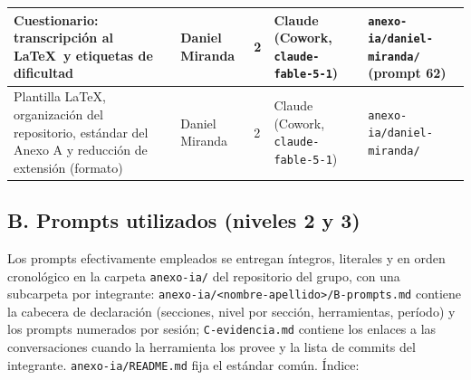 \documentclass[12pt, letterpaper, table, xcdraw]{inf-pucv}
\begin{document}
{\begin{longtable}{|p{4.2cm}|p{2.2cm}|p{0.9cm}|p{4.2cm}|p{2.4cm}|}
    Cuestionario: transcripción al \LaTeX\ y etiquetas de dificultad & Daniel Miranda & 2 & Claude (Cowork, \texttt{claude-fable-5-1}) & \texttt{anexo-ia/daniel-miranda/} (prompt 62) \\ \hline
    Plantilla \LaTeX, organización del repositorio, estándar del Anexo A y reducción de extensión (formato) & Daniel Miranda & 2 & Claude (Cowork, \texttt{claude-fable-5-1}) & \texttt{anexo-ia/daniel-miranda/} \\ \hline
\end{longtable}
}

\subsection*{B. Prompts utilizados (niveles 2 y 3)}

Los prompts efectivamente empleados se entregan íntegros, literales y en orden cronológico en la carpeta \texttt{anexo-ia/} del repositorio del grupo, con una subcarpeta por integrante: \texttt{anexo-ia/<nombre-apellido>/B-prompts.md} contiene la cabecera de declaración (secciones, nivel por sección, herramientas, período) y los prompts numerados por sesión; \texttt{C-evidencia.md} contiene los enlaces a las conversaciones cuando la herramienta los provee y la lista de commits del integrante. \texttt{anexo-ia/README.md} fija el estándar común. Índice:
\end{document}
